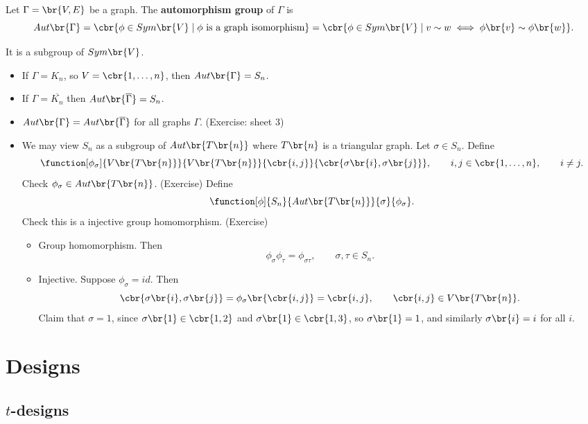 \begin{definition*}
Let $ \Gamma = \br{V, E} $ be a graph. The \textbf{automorphism group} of $ \Gamma $ is
$$ Aut\br{\Gamma} = \cbr{\phi \in Sym\br{V} \mid \phi \ \text{is a graph isomorphism}} = \cbr{\phi \in Sym\br{V} \mid v \sim w \iff \phi\br{v} \sim \phi\br{w}}. $$
\end{definition*}

It is a subgroup of $ Sym\br{V} $.

\begin{example*}
\hfill
\begin{itemize}
\item If $ \Gamma = K_n $, so $ V = \cbr{1, \dots, n} $, then $ Aut\br{\Gamma} = S_n $.
\item If $ \Gamma = \overline{K_n} $ then $ Aut\br{\overline{\Gamma}} = S_n $.
\item $ Aut\br{\Gamma} = Aut\br{\overline{\Gamma}} $ for all graphs $ \Gamma $. (Exercise: sheet $ 3 $)
\item We may view $ S_n $ as a subgroup of $ Aut\br{T\br{n}} $ where $ T\br{n} $ is a triangular graph. Let $ \sigma \in S_n $. Define
$$ \function[\phi_\sigma]{V\br{T\br{n}}}{V\br{T\br{n}}}{\cbr{i, j}}{\cbr{\sigma\br{i}, \sigma\br{j}}}, \qquad i, j \in \cbr{1, \dots, n}, \qquad i \ne j. $$
Check $ \phi_\sigma \in Aut\br{T\br{n}} $. (Exercise) Define
$$ \function[\phi]{S_n}{Aut\br{T\br{n}}}{\sigma}{\phi_\sigma}. $$
Check this is a injective group homomorphism. (Exercise)
\begin{itemize}
\item Group homomorphism. Then
$$ \phi_\sigma\phi_\tau = \phi_{\sigma\tau}, \qquad \sigma, \tau \in S_n. $$
\item Injective. Suppose $ \phi_\sigma = id $. Then
$$ \cbr{\sigma\br{i}, \sigma\br{j}} = \phi_\sigma\br{\cbr{i, j}} = \cbr{i, j}, \qquad \cbr{i, j} \in V\br{T\br{n}}. $$
Claim that $ \sigma = 1 $, since $ \sigma\br{1} \in \cbr{1, 2} $ and $ \sigma\br{1} \in \cbr{1, 3} $, so $ \sigma\br{1} = 1 $, and similarly $ \sigma\br{i} = i $ for all $ i $.
\end{itemize}
\end{itemize}
\end{example*}

\pagebreak

\section{Designs}

\subsection{$ t $-designs}

